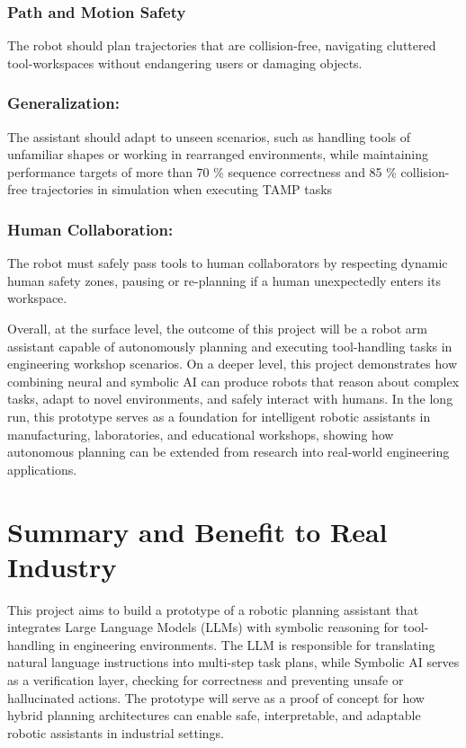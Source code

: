 \documentclass[12pt]{extarticle}
\begin{document}
\subsubsection{Path and Motion Safety}
The robot should plan trajectories that are collision-free, navigating cluttered tool-workspaces without endangering users or damaging objects.

\subsubsection{Generalization:} The assistant should adapt to unseen scenarios, such as handling tools of unfamiliar shapes or working in rearranged environments, while maintaining performance targets of more than 70 \% sequence correctness and 85 \% collision-free trajectories in simulation when executing TAMP tasks~\cite{tamp}

\subsubsection{Human Collaboration:} The robot must safely pass tools to human collaborators by respecting dynamic human safety zones, pausing or re-planning if a human unexpectedly enters its workspace.

Overall, at the surface level, the outcome of this project will be a robot arm assistant capable of autonomously planning and executing tool-handling tasks in engineering workshop scenarios. On a deeper level, this project demonstrates how combining neural and symbolic AI can produce robots that reason about complex tasks, adapt to novel environments, and safely interact with humans. In the long run, this prototype serves as a foundation for intelligent robotic assistants in manufacturing, laboratories, and educational workshops, showing how autonomous planning can be extended from research into real-world engineering applications.

\newpage
\section{Summary and Benefit to Real Industry}

This project aims to build a prototype of a robotic planning assistant that integrates Large Language Models (LLMs) with symbolic reasoning for tool-handling in engineering environments. The LLM is responsible for translating natural language instructions into multi-step task plans, while Symbolic AI serves as a verification layer, checking for correctness and preventing unsafe or hallucinated actions. The prototype will serve as a proof of concept for how hybrid planning architectures can enable safe, interpretable, and adaptable robotic assistants in industrial settings.
\end{document}
